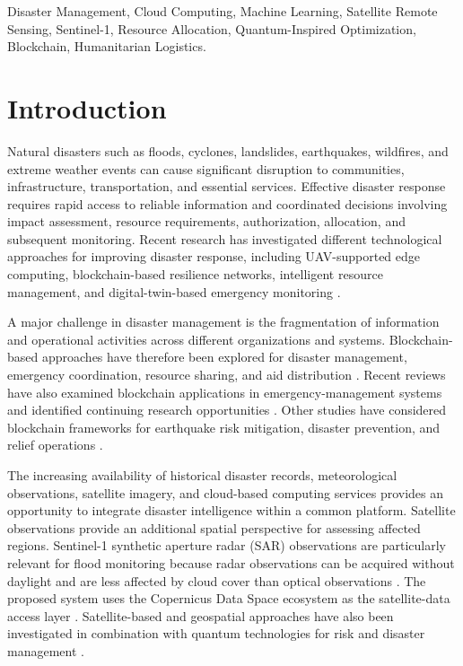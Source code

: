 \documentclass[conference]{IEEEtran}
\begin{document}
\begin{IEEEkeywords}
Disaster Management, Cloud Computing, Machine Learning, Satellite Remote Sensing, Sentinel-1, Resource Allocation, Quantum-Inspired Optimization, Blockchain, Humanitarian Logistics.
\end{IEEEkeywords}

\section{Introduction}
Natural disasters such as floods, cyclones, landslides, earthquakes, wildfires, and extreme weather events can cause significant disruption to communities, infrastructure, transportation, and essential services. Effective disaster response requires rapid access to reliable information and coordinated decisions involving impact assessment, resource requirements, authorization, allocation, and subsequent monitoring. Recent research has investigated different technological approaches for improving disaster response, including UAV-supported edge computing, blockchain-based resilience networks, intelligent resource management, and digital-twin-based emergency monitoring \cite{ref1, ref2, ref3, ref4, ref5}.

A major challenge in disaster management is the fragmentation of information and operational activities across different organizations and systems. Blockchain-based approaches have therefore been explored for disaster management, emergency coordination, resource sharing, and aid distribution \cite{ref6, ref7, ref8}. Recent reviews have also examined blockchain applications in emergency-management systems and identified continuing research opportunities \cite{ref9, ref10}. Other studies have considered blockchain frameworks for earthquake risk mitigation, disaster prevention, and relief operations \cite{ref11, ref12}.

The increasing availability of historical disaster records, meteorological observations, satellite imagery, and cloud-based computing services provides an opportunity to integrate disaster intelligence within a common platform. Satellite observations provide an additional spatial perspective for assessing affected regions. Sentinel-1 synthetic aperture radar (SAR) observations are particularly relevant for flood monitoring because radar observations can be acquired without daylight and are less affected by cloud cover than optical observations \cite{ref13}. The proposed system uses the Copernicus Data Space ecosystem as the satellite-data access layer \cite{ref14}. Satellite-based and geospatial approaches have also been investigated in combination with quantum technologies for risk and disaster management \cite{ref15}.
\end{document}
